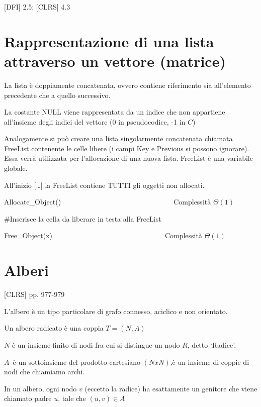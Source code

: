 \documentclass[tikz]{article}
\begin{document}
{{{{[}DFI{]} 2.5; {[}CLRS{]} 4.3}

\section{Rappresentazione di una lista attraverso un vettore (matrice)}

{La lista è doppiamente concatenata, ovvero contiene riferimento sia all'elemento precedente che a quello successivo.}

{La costante NULL viene rappresentata da un indice che non appartiene all'insieme degli indici del vettore (0 in pseudocodice, -1 in $C$)}



{Analogamente si può creare una lista singolarmente concatenata chiamata FreeList contenente le celle libere (i campi Key e Previous si possono ignorare). Essa verrà utilizzata per l'allocazione di una nuova lista. FreeList è una variabile globale.}

{All'inizio {[}\ldots{}{]} la FreeList contiene TUTTI gli oggetti non allocati.}

{Allocate\_Object()~~~~~~~~~~~~~~~~~~~~~~~~~~~~~~~~}{Complessità $\Theta(1)$}



{\#Inserisce la cella da liberare in testa alla FreeList}

{Free\_Object(x)}{~~~~~~~~~~~~~~~~~~~~~~~~~~~~~~~~Complessità $\Theta(1)$}



\section{Alberi}

{{[}CLRS{]} pp. 977-979}

{L'albero è un tipo particolare di grafo connesso, aciclico e non orientato.}

{Un albero radicato è una coppia $T=(N,A)$}

{$N$ è un insieme finito di nodi fra cui si distingue un nodo $R$, detto `Radice'.}

$A${~è un sottoinsieme del prodotto cartesiano $(NxN)$,è un insieme di coppie di nodi che chiamiamo archi.}

{In un albero, ogni nodo $v$ (eccetto la radice) ha esattamente un genitore che viene chiamato padre $u$, tale che $(u,v) \in A$}

}}
\end{document}
